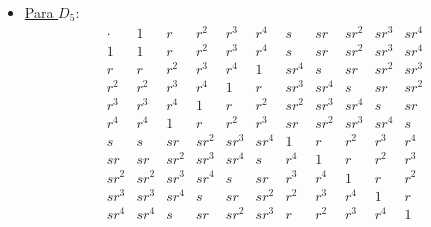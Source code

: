 \begin{ejercicio}
\begin{itemize}
        \item \ul{Para $D_5$}:
        \begin{equation*}
            \begin{array}{c|cccccccccc}
                \cdot & 1 & r & r^2 & r^3 & r^4 & s & sr & sr^2 & sr^3 & sr^4 \\ \hline
                1 & 1 & r & r^2 & r^3 & r^4 & s & sr & sr^2 & sr^3 & sr^4 \\
                r & r & r^2 & r^3 & r^4 & 1 & sr^4 & s & sr & sr^2 & sr^3 \\
                r^2 & r^2 & r^3 & r^4 & 1 & r & sr^3 & sr^4 & s & sr & sr^2 \\
                r^3 & r^3 & r^4 & 1 & r & r^2 & sr^2 & sr^3 & sr^4 & s & sr \\
                r^4 & r^4 & 1 & r & r^2 & r^3 & sr & sr^2 & sr^3 & sr^4 & s \\
                s & s & sr & sr^2 & sr^3 & sr^4 & 1 & r & r^2 & r^3 & r^4 \\
                sr & sr & sr^2 & sr^3 & sr^4 & s & r^4 & 1 & r & r^2 & r^3 \\
                sr^2 & sr^2 & sr^3 & sr^4 & s & sr & r^3 & r^4 & 1 & r & r^2 \\
                sr^3 & sr^3 & sr^4 & s & sr & sr^2 & r^2 & r^3 & r^4 & 1 & r \\
                sr^4 & sr^4 & s & sr & sr^2 & sr^3 & r & r^2 & r^3 & r^4 & 1
            \end{array}
        \end{equation*}


\end{itemize}
\end{ejercicio}
